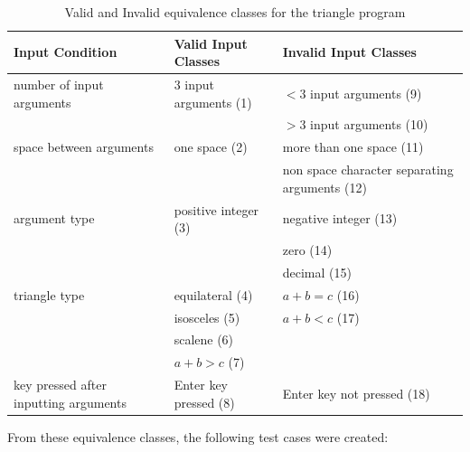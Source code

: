 \documentclass[letterpaper]{article}
\begin{document}
\begin{table}[H]
    \begin{tabularx}{1.1\textwidth}{X|X|X|}
        \centering
        Input Condition                       & Valid Input Classes   & Invalid Input Classes                         \\ \hline
        number of input arguments             & 3 input arguments (1) & $< 3$ input arguments (9)                     \\
                                              &                       & $> 3$ input arguments (10)                    \\ \hline
        space between arguments               & one space (2)         & more than one space (11)                      \\
                                              &                       & non space character separating arguments (12) \\ \hline
        argument type                         & positive integer (3)  & negative integer (13)                         \\
                                              &                       & zero (14)                                     \\
                                              &                       & decimal (15)                                  \\ \hline
        triangle type                         & equilateral (4)       & $a + b = c$ (16)                              \\
                                              & isosceles (5)         & $a + b < c$ (17)                              \\
                                              & scalene (6)           &                                               \\
                                              & $a + b > c$ (7)       &                                               \\ \hline
        key pressed after inputting arguments & Enter key pressed (8) & Enter key not pressed (18)                    \\ \hline
    \end{tabularx}
    \caption{Valid and Invalid equivalence classes for the triangle program}
    \label{equivalenceclasses}
\end{table}

From these equivalence classes, the following test cases were created:
\end{document}
